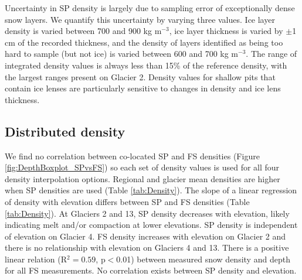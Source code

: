 \documentclass[review,oneside, letterpaper]{igs}
\begin{document}
Uncertainty in SP density is largely due to sampling error of exceptionally dense snow layers. We quantify this uncertainty by varying three values. Ice layer density is varied between 700 and 900 kg m$^{-3}$, ice layer thickness is varied by $\pm$1 cm of the recorded thickness, and the density of layers identified as being too hard to sample (but not ice) is varied between 600 and 700 kg m$^{-3}$. The range of integrated density values is always less than 15\% of the reference density, with the largest ranges present on Glacier 2. Density values for shallow pits that contain ice lenses are particularly sensitive to changes in density and ice lens thickness.

\subsection{Distributed density}

We find no correlation between co-located SP and FS densities (Figure \ref{fig:DepthBoxplot_SPvsFS}) so each set of density values is used for all four density interpolation options. Regional and glacier mean densities are higher when SP densities are used (Table \ref{tab:Density}). The slope of a linear regression of density with elevation differs between SP and FS densities (Table \ref{tab:Density}). At Glaciers 2 and 13, SP density decreases with elevation, likely indicating melt and/or compaction at lower elevations. SP density is independent of elevation on Glacier 4. FS density increases with elevation on Glacier 2 and there is no relationship with elevation on Glaciers 4 and 13. There is a positive linear relation (R$^2= 0.59$, p$<$0.01) between measured snow density and depth for all FS measurements. No correlation exists between SP density and elevation.
\end{document}
